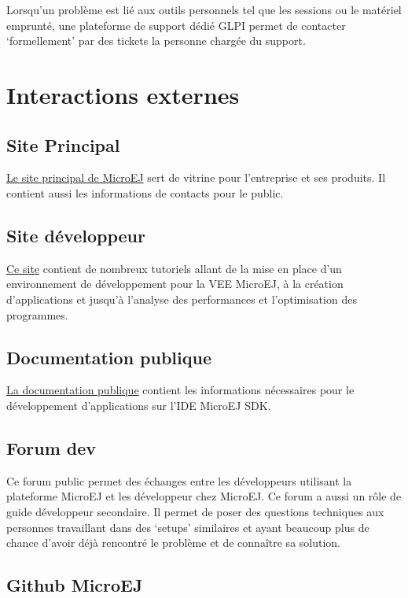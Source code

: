 \documentclass[french,a4paper,12pt]{report}
\begin{document}
Lorsqu’un problème est lié aux outils personnels tel que les sessions ou le matériel emprunté, une plateforme de support dédié GLPI permet de contacter ‘formellement’ par des tickets la personne chargée du support.

\section{Interactions externes}
\subsection{Site Principal}

\href{https://www.microej.com/}{Le site principal de MicroEJ} sert de vitrine pour l'entreprise et ses produits. Il contient aussi les informations de contacts pour le public.

\subsection{Site développeur}

\href{https://developer.microej.com/}{Ce site} contient de nombreux tutoriels allant de la mise en place d'un environnement de développement pour la VEE MicroEJ, à la création d'applications et jusqu'à l'analyse des performances et l'optimisation des programmes.

\subsection{Documentation publique}

\href{https://docs.microej.com/en/latest/}{La documentation publique} contient les informations nécessaires pour le développement d’applications sur l’IDE MicroEJ SDK.

\subsection{Forum dev}

Ce forum public permet des échanges entre les développeurs utilisant la plateforme MicroEJ et les développeur chez MicroEJ. Ce forum a aussi un rôle de guide développeur secondaire. Il permet de poser des questions techniques aux personnes travaillant dans des ‘setups’ similaires et ayant beaucoup plus de chance d’avoir déjà rencontré le problème et de connaître sa solution.

\subsection{Github MicroEJ}
\end{document}
